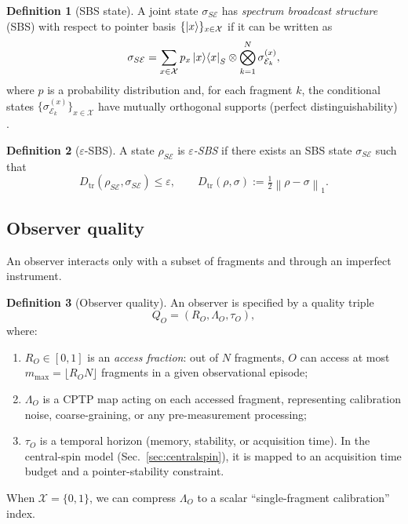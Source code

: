 \documentclass[11pt]{article}
\newcommand{\cE}{\mathcal{E}}
\newcommand{\cX}{\mathcal{X}}
\newcommand{\Dtr}{D_{\mathrm{tr}}}
\newcommand{\normone}[1]{\left\lVert #1\right\rVert_{1}}
\newcommand{\1}{\mathbf{1}}
\theoremstyle{definition}
\newtheorem{definition}{Definition}
\theoremstyle{plain}
\begin{document}
\begin{definition}[SBS state]
A joint state $\sigma_{S\cE}$ has \emph{spectrum broadcast structure} (SBS) with respect to pointer basis $\{\ket{x}\}_{x\in\cX}$ if it can be written as
\begin{equation}
\sigma_{S\cE}=\sum_{x\in\cX} p_x \ket{x}\!\bra{x}_S \otimes \bigotimes_{k=1}^N \sigma^{(x)}_{\cE_k},
\label{eq:sbs}
\end{equation}
where $p$ is a probability distribution and, for each fragment $k$, the conditional states $\{\sigma^{(x)}_{\cE_k}\}_{x\in\cX}$ have mutually orthogonal supports (perfect distinguishability) \citep{HorodeckiKorbiczHorodecki2015,KorbiczReview2021}.
\end{definition}

\begin{definition}[$\varepsilon$-SBS]
A state $\rho_{S\cE}$ is \emph{$\varepsilon$-SBS} if there exists an SBS state $\sigma_{S\cE}$ such that
\[
\Dtr(\rho_{S\cE},\sigma_{S\cE})\le \varepsilon,
\qquad
\Dtr(\rho,\sigma):=\tfrac12\normone{\rho-\sigma}.
\]
\end{definition}

\subsection{Observer quality}

An observer interacts only with a subset of fragments and through an imperfect instrument.

\begin{definition}[Observer quality]
An observer is specified by a quality triple
\[
Q_O=(R_O,\Lambda_O,\tau_O),
\]
where:
\begin{enumerate}[leftmargin=2em]
\item $R_O\in[0,1]$ is an \emph{access fraction}: out of $N$ fragments, $O$ can access at most $m_{\max}=\lfloor R_O N\rfloor$ fragments in a given observational episode;
\item $\Lambda_O$ is a CPTP map acting on each accessed fragment, representing calibration noise, coarse-graining, or any pre-measurement processing;
\item $\tau_O$ is a temporal horizon (memory, stability, or acquisition time). In the central-spin model (Sec.~\ref{sec:centralspin}), it is mapped to an acquisition time budget and a pointer-stability constraint.
\end{enumerate}
\end{definition}

When $\cX=\{0,1\}$, we can compress $\Lambda_O$ to a scalar ``single-fragment calibration'' index.
\end{document}
